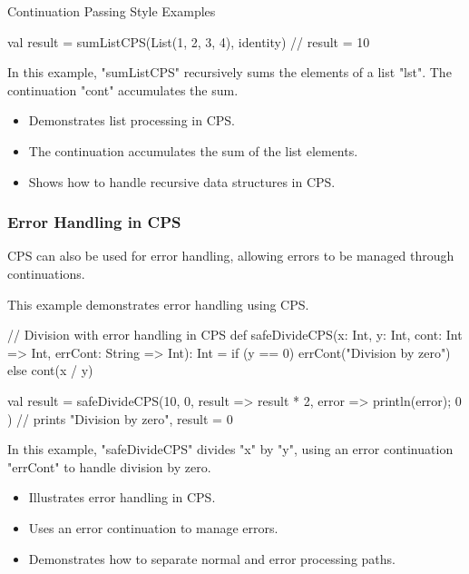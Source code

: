 \begin{notes}{Continuation Passing Style Examples}
\begin{highlight}
\begin{code}[Scala]
    val result = sumListCPS(List(1, 2, 3, 4), identity)  // result = 10
    \end{code}
    
        In this example, "sumListCPS" recursively sums the elements of a list "lst". The continuation "cont" accumulates the sum.
    
        \begin{itemize}
            \item Demonstrates list processing in CPS.
            \item The continuation accumulates the sum of the list elements.
            \item Shows how to handle recursive data structures in CPS.
        \end{itemize}
    
    \end{highlight}
    
    \subsubsection*{Error Handling in CPS}
    
    CPS can also be used for error handling, allowing errors to be managed through continuations.
    
    \begin{highlight}
    
        This example demonstrates error handling using CPS.
    
    \begin{code}[Scala]
    // Division with error handling in CPS
    def safeDivideCPS(x: Int, y: Int, cont: Int => Int, errCont: String => Int): Int =
        if (y == 0) errCont("Division by zero")
        else cont(x / y)
    
    val result = safeDivideCPS(10, 0, result => result * 2, error => { println(error); 0 })  // prints "Division by zero", result = 0
    \end{code}
    
        In this example, "safeDivideCPS" divides "x" by "y", using an error continuation "errCont" to handle division by zero.
    
        \begin{itemize}
            \item Illustrates error handling in CPS.
            \item Uses an error continuation to manage errors.
            \item Demonstrates how to separate normal and error processing paths.
        \end{itemize}
    

\end{highlight}
\end{notes}
